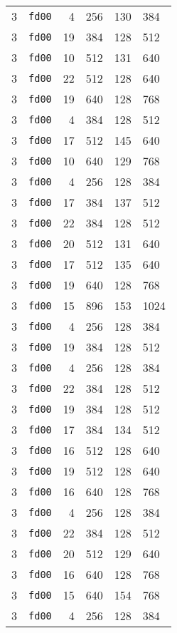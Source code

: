 \documentclass{article}
\begin{document}
\begin{table}[h!]
\begin{tabular}{llrrrl}
    3 & \texttt{fd00} & 4 & 256 & 130 & 384 \\
    3 & \texttt{fd00} & 19 & 384 & 128 & 512 \\
    3 & \texttt{fd00} & 10 & 512 & 131 & 640 \\
    3 & \texttt{fd00} & 22 & 512 & 128 & 640 \\
    3 & \texttt{fd00} & 19 & 640 & 128 & 768 \\
    3 & \texttt{fd00} & 4 & 384 & 128 & 512 \\
    3 & \texttt{fd00} & 17 & 512 & 145 & 640 \\
    3 & \texttt{fd00} & 10 & 640 & 129 & 768 \\
    3 & \texttt{fd00} & 4 & 256 & 128 & 384 \\
    3 & \texttt{fd00} & 17 & 384 & 137 & 512 \\
    3 & \texttt{fd00} & 22 & 384 & 128 & 512 \\
    3 & \texttt{fd00} & 20 & 512 & 131 & 640 \\
    3 & \texttt{fd00} & 17 & 512 & 135 & 640 \\
    3 & \texttt{fd00} & 19 & 640 & 128 & 768 \\
    3 & \texttt{fd00} & 15 & 896 & 153 & 1024 \\
    3 & \texttt{fd00} & 4 & 256 & 128 & 384 \\
    3 & \texttt{fd00} & 19 & 384 & 128 & 512 \\
    3 & \texttt{fd00} & 4 & 256 & 128 & 384 \\
    3 & \texttt{fd00} & 22 & 384 & 128 & 512 \\
    3 & \texttt{fd00} & 19 & 384 & 128 & 512 \\
    3 & \texttt{fd00} & 17 & 384 & 134 & 512 \\
    3 & \texttt{fd00} & 16 & 512 & 128 & 640 \\
    3 & \texttt{fd00} & 19 & 512 & 128 & 640 \\
    3 & \texttt{fd00} & 16 & 640 & 128 & 768 \\
    3 & \texttt{fd00} & 4 & 256 & 128 & 384 \\
    3 & \texttt{fd00} & 22 & 384 & 128 & 512 \\
    3 & \texttt{fd00} & 20 & 512 & 129 & 640 \\
    3 & \texttt{fd00} & 16 & 640 & 128 & 768 \\
    3 & \texttt{fd00} & 15 & 640 & 154 & 768 \\
    3 & \texttt{fd00} & 4 & 256 & 128 & 384 \\

\end{tabular}
\end{table}
\end{document}
